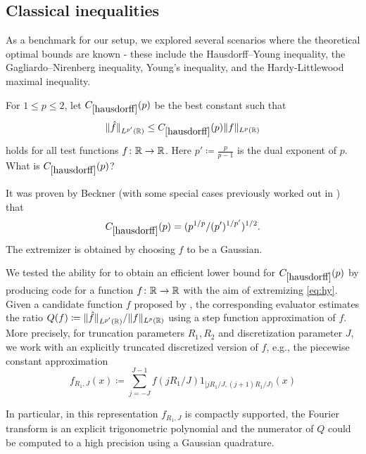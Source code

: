 \subsection{Classical inequalities}

As a benchmark for our setup, we explored several scenarios where the theoretical optimal bounds are known \cite{lieb2001analysis,folland1999real} - these include the Hausdorff--Young inequality, the Gagliardo--Nirenberg inequality, Young's inequality, and the Hardy-Littlewood maximal inequality.

\renewcommand{\problemURL}{https://google-deepmind.github.io/alphaevolve_repository_of_problems/problems/14.html}

\begin{problem}\label{hausdorff}  For $1 \leq p \leq 2$, let $C_{\ref{hausdorff}}(p)$ be the best constant such that 
\begin{equation}\label{eq:hy} \| \hat f \|_{L^{p'}(\mathbb{R})} \leq C_{\ref{hausdorff}}(p) \| f \|_{L^p(\mathbb{R})}
\end{equation}
holds for all test functions $f \colon \mathbb{R} \to \mathbb{R}$. Here $p' \coloneqq \frac{p}{p-1}$ is the dual exponent of $p$.  What is
$C_{\ref{hausdorff}}(p)$?
\end{problem}

It was proven by Beckner \cite{beckner} (with some special cases previously worked out in \cite{babenko}) that
$$ C_{\ref{hausdorff}}(p) = (p^{1/p} / (p')^{1/p'})^{1/2}.$$
The extremizer is obtained by choosing $f$ to be a Gaussian.

We tested the ability for \AlphaEvolve to obtain an efficient lower bound for $C_{\ref{hausdorff}}(p)$ by producing code for a function $f \colon \mathbb{R} \to \mathbb{R}$ with the aim of extremizing \eqref{eq:hy}. Given a candidate function $f$ proposed by \AlphaEvolve, the corresponding evaluator estimates the ratio $ Q(f) \coloneqq \| \hat f \|_{L^{p'}(\mathbb{R})} / \| f \|_{L^p(\mathbb{R})}$ using a step function approximation of $f$. More precisely, for truncation parameters $R_1, R_2$ and discretization parameter $J$, we work with an explicitly truncated discretized version of $f$, e.g., the piecewise constant approximation
$$ f_{R_1,J}(x) \coloneqq \sum_{j=-J}^{J-1} f(jR_1/J) 1_{[jR_1/J, (j+1)R_1/J)}(x)$$

In particular, in this representation $f_{R_1, J}$ is compactly supported, the Fourier transform is an explicit trigonometric polynomial and the numerator of $Q$ could be computed to a high precision using a Gaussian quadrature.

